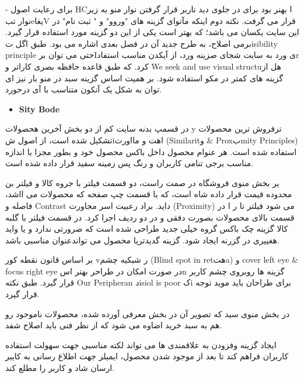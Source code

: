\documentclass[13pt]{article}
\begin{document}
- برای رعایت اصول HCا  بهنر بود برای \guillemotleft{}در جلوی دید ناربر قرار
گرفتن\guillemotright{} نوار منو به زیر نوار تبeیغاV قرار می گرفت. نکته دوم اینکه
مآتوای گزینه های "وروو" و " ثبت نام" در این سایت یکسان می باشد؛ که بهتر است یکی
از این دو گزینه مورد استفاده قرار گیرد. برمی اصلاح، به طرح جدید آن در فصل بعدی
اشاره می بود. طبق اگل تisibility principle حتی می توان برIی ورد به سایت شجای
صزینه \guillemotleft{}ورد\guillemotright{}، از آیکدن مناسب استفادr کرد. که طبق
قاعده \guillemotleft{}حافظه بصری کاراتر\guillemotright{} و \guillemotleft{} We
seek and use visual structuهل \guillemotright{} از گزینه های کمتر در مکو استفاده
شود. بر همیت اساس گزینه \guillemotleft{}سبد\guillemotright{} در منو بار نیز ای
توان به شکل یک آنکون متناسب با آی درحورد.

\begin{itemize}
	\item \textbf{{\small Sity Bode}}
\end{itemize}

در قسمپ بدنه سایت کم از دو بخش \guillemotleft{} آخرین هحصولات\guillemotright{} y
\guillemotleft{} ترفروش ترین محصولات\guillemotright{} تشکیل شده است، از اصول
شiاهت و مااورت (Similaritو \& Proxبmity Principles) استفاده شده است. هر عنوام
محصول داخل باکس محصول خود و بطور مجزا با اندازه مناسب برجی تنامی کاربران و رنگ پس
زمینه سفید قرار داده شده است.

یر بخش منوی \guillemotleft{}فروشگاه\guillemotright{} در صمت راست، دو قسمت
\guillemotleft{}فیلتر با جروه کالا\guillemotright{} و \guillemotleft{} فیلتر بن
محدوده قیمت\guillemotright{} قرار داده شاه است، که با قسمت چپ صفحه که محصولات می
ااشد، فاصله و  Contrast داید. براد رعبیت اسر مجاورت (Proximity) می شود فیلتر تا ر
ا در قسمت بالای محصولات بصورت دفقی و در دو ردیف اجرا کرد. در قسمت
\guillemotleft{}فیلتر با گلبه کالا\guillemotright{} گزینه چک باکس
\guillemotleft{}گروه خیلی جدید\guillemotright{} طراحی شده است که ضرورتی ندارد و
یا واید هغییری در گزرنه ایجاد شود. گزینه \guillemotleft{}گدیدتریا
محصول\guillemotright{} می تواندعنوان مناسبی باشد.

بر اساس قانون نقطه کور vر شبکیه چشم (Blind spot in retهتa) و cover left eye \&
focus right eye در صورت امکان در طراحر بهتر اسn گزینه ها روبروی چشم کاربر قرار
گیرد. طبق نکته Our Peripheran دisiol is poor کi برای طراحان باید موید توجه قرار
گیرد.

در بخش منوی \guillemotleft{}سبد\guillemotright{} که تصویر آن در بخش معرفی آورده
شده، محصولات ناموجود رو هم به سبد خرید اضاوه می شود که از نظر فنی باید اصلاح شفد.

ایجاد گزینه \guillemotleft{}وفزودن به علاقمندی ها\guillemotright{} می تواند لکته
مناسبی جهت سهولت استفاده کاربران فراهم کند تا بعد از موجود شدن محصول، ایمیلر جهت
اطلاع رسانی به کایبر ارسان شاد و کاربر را مطلع کند.
\end{document}
